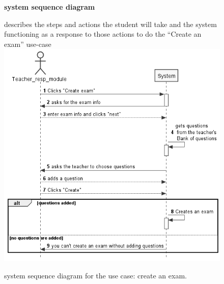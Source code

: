 \documentclass[]{uc2pfecaneva}
\begin{document}
    \begin{figure}
        \raggedright\textbf{system sequence diagram}\linebreak
        \raggedright{describes the steps and actions the student will take and the system functioning as a response
        to those actions to do the “Create an exam” use-case}\linebreak
        \linebreak
        \includegraphics[width=\textwidth]{images/Create_Exam}
        \caption{system sequence diagram for the use case: create an exam.}
    \end{figure}
    \clearpage
\end{document}
